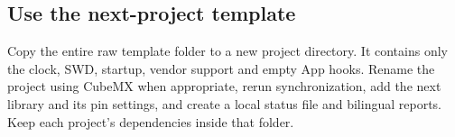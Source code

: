 \subsection{Use the next-project template}
Copy the entire raw template folder to a new project directory. It contains
only the clock, SWD, startup, vendor support and empty App hooks. Rename the
project using CubeMX when appropriate, rerun synchronization, add the next
library and its pin settings, and create a local status file and bilingual
reports. Keep each project's dependencies inside that folder.
